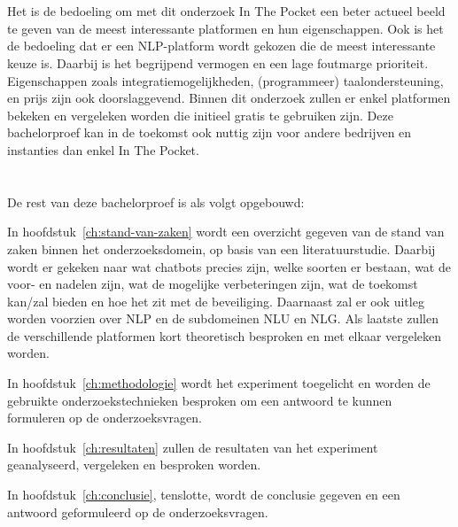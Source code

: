 \section{}
\label{sec:onderzoeksdoelstelling}

Het is de bedoeling om met dit onderzoek In The Pocket een beter actueel beeld te geven van de meest interessante platformen en hun eigenschappen. Ook is het de bedoeling dat er een NLP-platform wordt gekozen die de meest interessante keuze is. Daarbij is het begrijpend vermogen en een lage foutmarge prioriteit. Eigenschappen zoals integratiemogelijkheden, (programmeer) taalondersteuning, en prijs zijn ook doorslaggevend. Binnen dit onderzoek zullen er enkel platformen bekeken en vergeleken worden die initieel gratis te gebruiken zijn. Deze bachelorproef kan in de toekomst ook nuttig zijn voor andere bedrijven en instanties dan enkel In The Pocket.

\newpage
\section{}
\label{sec:opzet-bachelorproef}


De rest van deze bachelorproef is als volgt opgebouwd:

In hoofdstuk~\ref{ch:stand-van-zaken} wordt een overzicht gegeven van de stand van zaken binnen het onderzoeksdomein, op basis van een literatuurstudie.  Daarbij wordt er gekeken naar wat chatbots precies zijn, welke soorten er bestaan, wat de voor- en nadelen zijn, wat de mogelijke verbeteringen zijn, wat de toekomst kan/zal bieden en hoe het zit met de beveiliging. Daarnaast zal er ook uitleg worden voorzien over NLP en de subdomeinen NLU en NLG. Als laatste zullen de verschillende platformen kort theoretisch besproken en met elkaar vergeleken worden.

In hoofdstuk~\ref{ch:methodologie} wordt het experiment toegelicht en worden de gebruikte onderzoekstechnieken besproken om een antwoord te kunnen formuleren op de onderzoeksvragen.

In hoofdstuk~\ref{ch:resultaten}  zullen de resultaten van het experiment geanalyseerd, vergeleken en besproken worden.

In hoofdstuk~\ref{ch:conclusie}, tenslotte, wordt de conclusie gegeven en een antwoord geformuleerd op de onderzoeksvragen.









